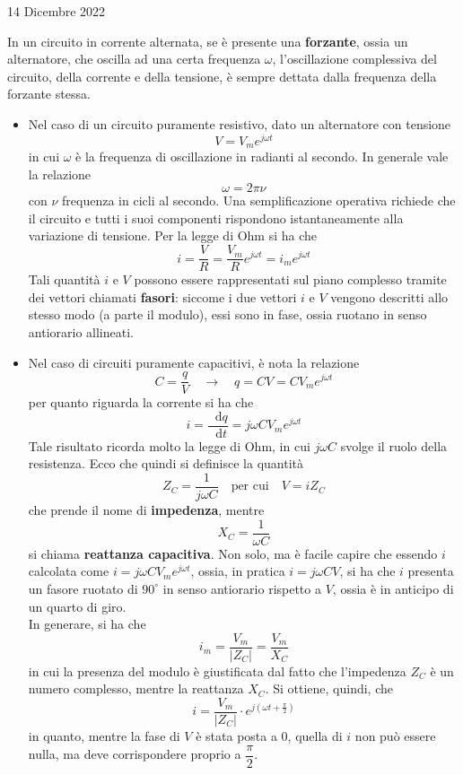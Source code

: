 \documentclass[a4paper]{extarticle}
\newcommand\dif{\mathop{}\!\mathrm{d}}
\begin{document}
\newpage
\noindent
\begin{center}
  14 Dicembre 2022
\end{center}
In un circuito in corrente alternata, se è presente una \textbf{forzante}, ossia un alternatore, che oscilla ad una certa frequenza $\omega$, l'oscillazione complessiva del circuito, della corrente e della tensione, è sempre dettata dalla frequenza della forzante stessa.
\begin{itemize}
  \item Nel caso di un circuito puramente resistivo, dato un alternatore con tensione
  \[V=V_m e^{j \omega t}\]
  in cui $\omega$ è la frequenza di oscillazione in radianti al secondo. In generale vale la relazione
  \[\omega = 2 \pi \nu\]
  con $\nu$ frequenza in cicli al secondo. Una semplificazione operativa richiede che il circuito e tutti i suoi componenti rispondono istantaneamente alla variazione di tensione. Per la legge di Ohm si ha che
  \[i=\dfrac{V}{R}=\dfrac{V_m}{R} e^{j \omega t} = i_m e^{j \omega t}\]
  Tali quantità $i$ e $V$ possono essere rappresentati sul piano complesso tramite dei vettori chiamati \textbf{fasori}: siccome i due vettori $i$ e $V$ vengono descritti allo stesso modo (a parte il modulo), essi sono in fase, ossia ruotano in senso antiorario allineati.

  \item Nel caso di circuiti puramente capacitivi, è nota la relazione
  \[C=\dfrac{q}{V} \hspace{1em} \rightarrow \hspace{1em} q=C V=CV_m e^{j \omega t}\]
  per quanto riguarda la corrente si ha che
  \[i=\dfrac{\dif q}{\dif t}=j\omega C V_m e^{j \omega t}\]
  Tale risultato ricorda molto la legge di Ohm, in cui $j \omega C$ svolge il ruolo della resistenza. Ecco che quindi si definisce la quantità
  \[Z_C=\dfrac{1}{j \omega C} \hspace{1em} \text{per cui} \hspace{1em} V=i Z_C\]
  che prende il nome di \textbf{impedenza}, mentre
  \[X_C=\dfrac{1}{\omega C}\]
  si chiama \textbf{reattanza capacitiva}. Non solo, ma è facile capire che essendo $i$ calcolata come $i=j\omega C V_m e^{j \omega t}$, ossia, in pratica $i=j \omega C V$, si ha che $i$ presenta un fasore ruotato di $90^\circ$ in senso antiorario rispetto a $V$, ossia è in anticipo di un quarto di giro.\\
  In generare, si ha che
  \[i_m=\dfrac{V_m}{\vert Z_C \vert} = \dfrac{V_m}{X_C}\]
  in cui la presenza del modulo è giustificata dal fatto che l'impedenza $Z_C$ è un numero complesso, mentre la reattanza $X_C$. Si ottiene, quindi, che
  \[i=\dfrac{V_m}{\vert Z_C \vert} \cdot e^{j \left(\omega t + \frac{\pi}{2}\right)}\]
  in quanto, mentre la fase di $V$ è stata posta a $0$, quella di $i$ non può essere nulla, ma deve corrispondere proprio a $\dfrac{\pi}{2}$.


\end{itemize}
\end{document}
